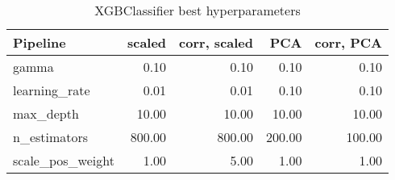 \begin{table}[!htb]
\caption{XGBClassifier best hyperparameters}
\label{table-xgbclassifier-params}
\centering
\begin{tabular}{lrrrr}
\toprule
Pipeline & scaled & corr, scaled & PCA & corr, PCA \\
\midrule
gamma & 0.10 & 0.10 & 0.10 & 0.10 \\
learning\_rate & 0.01 & 0.01 & 0.10 & 0.10 \\
max\_depth & 10.00 & 10.00 & 10.00 & 10.00 \\
n\_estimators & 800.00 & 800.00 & 200.00 & 100.00 \\
scale\_pos\_weight & 1.00 & 5.00 & 1.00 & 1.00 \\
\bottomrule
\end{tabular}
\end{table}
